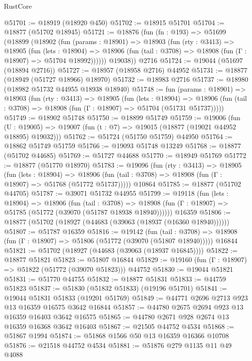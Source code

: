 \begin{lexlean}{RustCore}
\begin{coremodule}
@51701 := @18919 (@18920 @450)
@51702 := @18915 @51701
@51704 := @18877 (@51702 @18945)
@51721 := @18876
    (fun (fn : @193) =>
    @51699
      (@18899
        (@18902
          (fun (params : @18901) =>
          @18903
            (fun (rty : @3413) =>
            @18905
              (fun (lets : @18904) =>
              @18906 (fun (tail : @3708) => @18908 (fun (Γ : @18907) => @51704 @18992))))))
        @19038))
    @2716
@51724 := @19044 (@51697 (@18894 @2716))
@51727 := @18957 (@18958 @2716) @44952
@51731 := @18877 (@18949 (@51727 @18966) @18970)
@51732 := @18983 @2716
@51737 := @18980 (@18982 @51732 @44955 @18938 @18940)
@51748 := fun (params : @18901) =>
  @18903
    (fun (rty : @3413) =>
    @18905
      (fun (lets : @18904) =>
      @18906 (fun (tail : @3708) => @18908 (fun (Γ : @18907) => @51704 (@51731 @51737)))))
@51749 := @18902 @51748
@51750 := @18899 @51749
@51759 := @19006
    (fun (U : @19005) => @19007 (fun (t : @7) => @19015 (@18877 (@19021 @44952 @18895) @19032)))
@51762 := @51724 (@51750 @51759) @44950
@51764 := @18862 @51749 @51759
@51766 := @19093 @51748 @13249
@51768 := @18877 (@51702 @44685)
@51769 := @51727 @44688
@51770 := @18949 @51769
@51772 := @18877 (@51770 @18970)
@51783 := @19096
    (fun (rty : @3413) =>
    @18905
      (fun (lets : @18904) =>
      @18906 (fun (tail : @3708) => @18908 (fun (Γ : @18907) => @51768 (@51772 @51737)))))
    @10864
@51785 := @18877 (@51702 @44705)
@51787 := @39071 @51732 @44955
@51799 := @19118
    (fun (lets : @18904) =>
    @18906
      (fun (tail : @3708) =>
      @18908 (fun (Γ : @18907) => @51785 (@51772 (@39070 (@51787 @18938 @18940))))))
    @16359
@51806 := @18877 (@51702 (@18927 (@44683 (@39063 (@18937 (@16360 @18940))))))
@51807 := @51787 @16359
@51816 := @19142
    (fun (tail : @3708) => @18908 (fun (Γ : @18907) => @51806 (@51772 (@39070 (@51807 @18940)))))
    @16844
@51821 := @51702 (@18927 (@44683 (@39063 (@18937 @16845))))
@51822 := @18877 @51821
@51823 := @51807 @16844
@51829 := @19160 (fun (Γ : @18907) => @51822 (@51772 (@39070 @51823))) @44752
@51830 := @19044 @51821
@51831 := @51770 @44755
@51832 := @18877 @51831
@51833 := @44759 @51823
@51837 := @51830 (@51832 @51833) (@19196 @51701)
@51841 := @19044 @51831 @51833 (@19201 @51769)
@51849 := @44771 @2696 @2713 @923 @13 @16359 @16575 @3642 @16844
@51857 := @44780 @2675 @2694 @923 @13 @16359 @16403 @3642 @16575
@51865 := @44780 @2671 @928 @2674 @13 @16359 @16368 @3642 @16403
@51867 := @21505 @44752 @4534
@51868 := @51867 @1994
@51874 := @51868 @1566 @50 @13 @16359 @16366 @10708
@51876 := @21518 @44752 @4534
@51881 := @51876 @279 @1135 @11 @49 @4088

\end{coremodule}
\end{lexlean}
